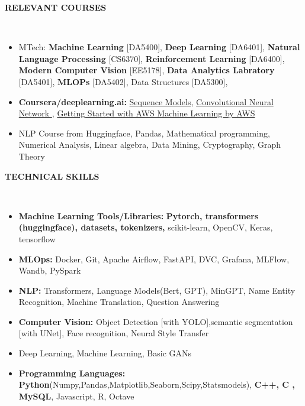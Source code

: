 \documentclass[a4paper,10pt]{article}
\newcommand{\lsep}{-0.5cm}
\newcommand{\resheading}[1]{{\small \colorbox{mygrey}{\begin{minipage}{0.975\textwidth}{\textbf{#1 \vphantom{p\^{E}}}}\end{minipage}}}}
\begin{document}
\resheading{\textbf{RELEVANT COURSES} }\\[\lsep]
\begin{itemize}
\setlength\itemsep{0.02em}

\item MTech: \textbf{Machine Learning} [DA5400], \textbf{Deep Learning} [DA6401], \textbf{Natural Language Processing} [CS6370], \textbf{Reinforcement Learning} [DA6400], \textbf{Modern Computer Vision} [EE5178], \textbf{Data Analytics Labratory} [DA5401], \textbf{MLOPs} [DA5402], Data Structures [DA5300], 

\item \textbf{Coursera/deeplearning.ai: }
\href{https://coursera.org/share/494211b74044bb124bcd4dd525ebe527}{Sequence Models},
\href{https://coursera.org/share/4eef4515a4c9099a507fe088d7689d24}{Convolutional Neural Network },
\href{https://coursera.org/share/6d84b47abf454cc3b3c30f170e335449}{Getting Started with AWS Machine Learning by AWS}
\item NLP Course from Huggingface, Pandas, Mathematical programming, Numerical Analysis, Linear algebra, Data Mining, Cryptography, Graph Theory
\end{itemize}

\resheading{\textbf{TECHNICAL SKILLS} }\\[\lsep]
\begin{itemize}
\setlength\itemsep{0em}

\item \textbf{Machine Learning Tools/Libraries: } \textbf{Pytorch, transformers (huggingface), datasets, tokenizers,} scikit-learn, OpenCV, Keras, tensorflow

\item \textbf{MLOps: } Docker, Git, Apache Airflow, FastAPI, DVC, Grafana, MLFlow, Wandb, PySpark
\item \textbf{NLP:} Transformers, Language Models(Bert, GPT), MinGPT, Name Entity Recognition, Machine Translation, Question Answering 
\item \textbf{Computer Vision:} Object Detection [with YOLO],semantic segmentation [with UNet], Face recognition, Neural Style Transfer
\item Deep Learning, Machine Learning, Basic GANs
\item \textbf{Programming Languages: } \textbf{Python}(Numpy,Pandas,Matplotlib,Seaborn,Scipy,Statsmodels),
\textbf{C++, C , MySQL}, Javascript, R, Octave
\end{itemize}
\end{document}
